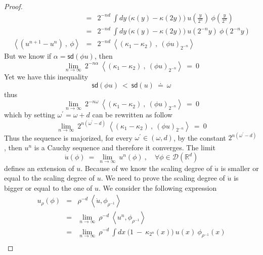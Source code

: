 \documentclass[10pt]{book}
\newcommand{\sd}{\mathsf{sd}}
\newcommand{\sm}[1]{\left\langle#1\right\rangle}
\let\int\int
\newcommand{\Dcal}{\mathcal{D}}
\newcommand{\Rbb}{\mathbb{R}}
\theoremstyle{break}
\begin{document}
\begin{proof}
\begin{eqnarray*}
  &=& 2^{-nd} \ \int dy \ \bigg(\kappa(y) - \kappa(2 y)\bigg) \ u\left(\frac{y}{2^n}\right) \ \phi\left(\frac{y}{2^n}\right) \\ 
  &=& 2^{-nd} \ \int dy \ \bigg(\kappa(y) - \kappa(2 y)\bigg) \ u\left(2^{-n} y \right) \ \phi\left(2^{-n} y\right) \\
  \sm{\left(u^{n+1} - u^n\right) \ , \ \phi} &=& 2^{-nd} \ \sm{\left(\kappa_1 - \kappa_2\right) \ , \ (\phi u)_{2^{-n}} }
 \end{eqnarray*}
 But we know if $\alpha = \sd(\phi u)$, then 
 \begin{equation*}
  \lim_{n \to \infty} \ 2^{-n\alpha} \ \sm{\left(\kappa_1 - \kappa_2\right) \ , \ (\phi u)_{2^{-n}}} \ = \ 0
 \end{equation*}
 Yet we have this inequality
 \begin{equation*}
  \sd(\phi u) \ < \ \sd(u) \ \doteq \ \omega %
 \end{equation*}
 thus
 \begin{equation*}
  \lim_{n \to \infty} \ 2^{-n\omega} \ \sm{\left(\kappa_1 - \kappa_2\right) \ , \ (\phi u)_{2^{-n}}} \ = \ 0
 \end{equation*}
 which by setting $\omega^\prime = \omega + d$ can be rewritten as follow
 \begin{equation*}
  \lim_{n \to \infty} \ 2^{n(\omega^\prime-d)} \ \sm{\left(\kappa_1 - \kappa_2\right) \ , \ (\phi u)_{2^{-n}}} \ = \ 0  
 \end{equation*}
 Thus the sequence is majorized, for every $\omega^\prime \in (\omega,d)$, by the constant $2^{n(\omega^\prime-d)}$, then $u^n$ is a Cauchy sequence and therefore it converges. The limit
 \begin{equation*}
  \dot{u}(\phi) \ = \ \lim_{n\to \infty} \ u^n(\phi) \ ,  \quad \forall \phi \in \Dcal(\Rbb^d)
 \end{equation*}
 defines an extension of $u$. Because of  we know the scaling degree of $\dot{u}$ is smaller or equal to the scaling degree of $u$. We need to prove the scaling degree of $\dot{u}$ is bigger or equal to the one of $u$. We consider the following expression
 \begin{eqnarray*}
  u_\rho(\phi) &=& \rho^{-d} \ \sm{\dot{u} , \phi_{\rho^{-1}}} \\
  &=& \lim_{n \to \infty} \ \rho^{-d} \ \sm{u^n , \phi_{\rho^{-1}}} \\
  &=& \lim_{n \to \infty} \ \rho^{-d} \ \int dx \ \bigg( 1 \ - \ \kappa_{2^n}(x) \bigg) \ u(x) \ \phi_{\rho^{-1}}(x) \\

\end{eqnarray*}
\end{proof}
\end{document}
